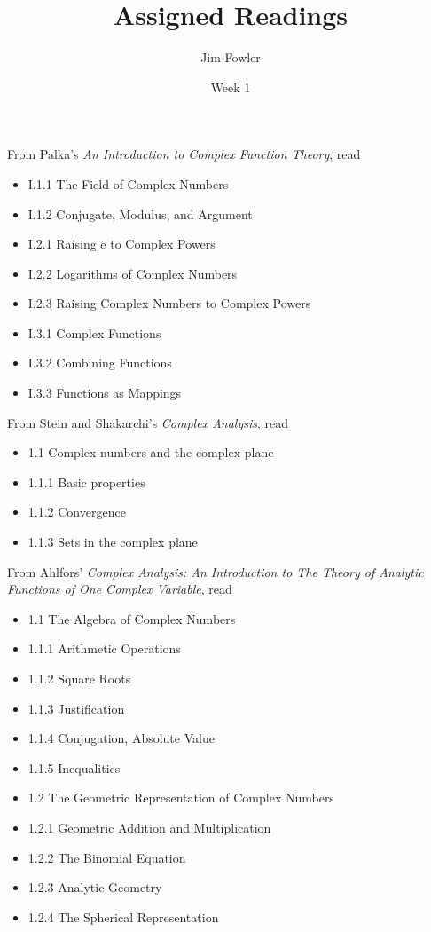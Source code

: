 \documentclass{homework}
\author{Jim Fowler}
\title{Assigned Readings}
\date{Week 1}
\begin{document}
\maketitle


From Palka's \textit{An Introduction to Complex Function Theory}, read
\begin{itemize}
\item I.1.1 The Field of Complex Numbers
\item I.1.2 Conjugate, Modulus, and Argument
\item I.2.1 Raising e to Complex Powers
\item I.2.2 Logarithms of Complex Numbers
\item I.2.3 Raising Complex Numbers to Complex Powers
\item I.3.1 Complex Functions
\item I.3.2 Combining Functions
\item I.3.3 Functions as Mappings
\end{itemize}

From Stein and Shakarchi's \textit{Complex Analysis}, read
\begin{itemize}
\item 1.1 Complex numbers and the complex plane
\item 1.1.1 Basic properties
\item 1.1.2 Convergence
\item 1.1.3 Sets in the complex plane
\end{itemize}

From Ahlfors' \textit{Complex Analysis: An Introduction to The Theory of Analytic Functions of One Complex Variable}, read
\begin{itemize}
\item 1.1 The Algebra of Complex Numbers
\item 1.1.1 Arithmetic Operations
\item 1.1.2 Square Roots
\item 1.1.3 Justification
\item 1.1.4 Conjugation, Absolute Value
\item 1.1.5 Inequalities
\item 1.2 The Geometric Representation of Complex Numbers
\item 1.2.1 Geometric Addition and Multiplication
\item 1.2.2 The Binomial Equation
\item 1.2.3 Analytic Geometry
\item 1.2.4 The Spherical Representation
\end{itemize}
\end{document}
